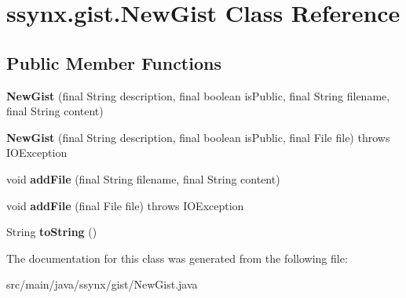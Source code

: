 \hypertarget{classssynx_1_1gist_1_1NewGist}{}\section{ssynx.\+gist.\+New\+Gist Class Reference}
\label{classssynx_1_1gist_1_1NewGist}
\subsection*{Public Member Functions}
\begin{DoxyCompactItemize}
\item 
\mbox{\label{classssynx_1_1gist_1_1NewGist_a2f0d270f3c86424e9928a2986e2d0660}} 
{\bfseries New\+Gist} (final String description, final boolean is\+Public, final String filename, final String content)
\item 
\mbox{\label{classssynx_1_1gist_1_1NewGist_a9336a2e1ec4a6d3c2ef6ad6f17cc6b43}} 
{\bfseries New\+Gist} (final String description, final boolean is\+Public, final File file)  throws I\+O\+Exception 
\item 
\mbox{\label{classssynx_1_1gist_1_1NewGist_a3e7f317440b171171291f83661e268d4}} 
void {\bfseries add\+File} (final String filename, final String content)
\item 
\mbox{\label{classssynx_1_1gist_1_1NewGist_a729bad36788560e4a46f49515a997c30}} 
void {\bfseries add\+File} (final File file)  throws I\+O\+Exception 
\item 
\mbox{\label{classssynx_1_1gist_1_1NewGist_a5e9bd2f807725243f0c81d15c52b0948}} 
String {\bfseries to\+String} ()
\end{DoxyCompactItemize}


The documentation for this class was generated from the following file\+:\begin{DoxyCompactItemize}
\item 
src/main/java/ssynx/gist/New\+Gist.\+java\end{DoxyCompactItemize}
